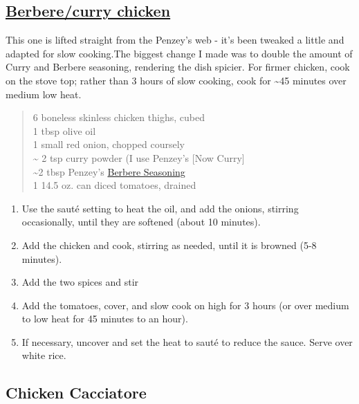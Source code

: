 \documentclass[
]{book}
\providecommand{\tightlist}{%
  \setlength{\itemsep}{0pt}\setlength{\parskip}{0pt}}
\begin{document}
\hypertarget{berberecurry-chicken}{%
\subsection{\texorpdfstring{\href{https://www.penzeys.com/shop/recipes/berbere-chicken-and-rice/}{Berbere/curry chicken}}{Berbere/curry chicken}}\label{berberecurry-chicken}}

This one is lifted straight from the Penzey's web - it's been tweaked a little and adapted for slow cooking.The biggest change I made was to double the amount of Curry and Berbere seasoning, rendering the dish spicier. For firmer chicken, cook on the stove top; rather than 3 hours of slow cooking, cook for \textasciitilde45 minutes over medium low heat.

\begin{quote}
6 boneless skinless chicken thighs, cubed\\
1 tbsp olive oil\\
1 small red onion, chopped coursely\\
\textasciitilde{} 2 tsp curry powder (I use Penzey's {[}Now Curry{]}\\
\textasciitilde2 tbsp Penzey's \href{https://www.penzeys.com/online-catalog/berbere-seasoning-blend/c-24/p-155/pd-s}{Berbere Seasoning}\\
1 14.5 oz. can diced tomatoes, drained
\end{quote}

\begin{enumerate}
\def\labelenumi{\arabic{enumi}.}
\tightlist
\item
  Use the sauté setting to heat the oil, and add the onions, stirring occasionally, until they are softened (about 10 minutes).\\
\item
  Add the chicken and cook, stirring as needed, until it is browned (5-8 minutes).\\
\item
  Add the two spices and stir
\item
  Add the tomatoes, cover, and slow cook on high for 3 hours (or over medium to low heat for 45 minutes to an hour).
\item
  If necessary, uncover and set the heat to sauté to reduce the sauce. Serve over white rice.
\end{enumerate}

\hypertarget{cacciatore}{%
\subsection{Chicken Cacciatore}\label{cacciatore}}
\end{document}
